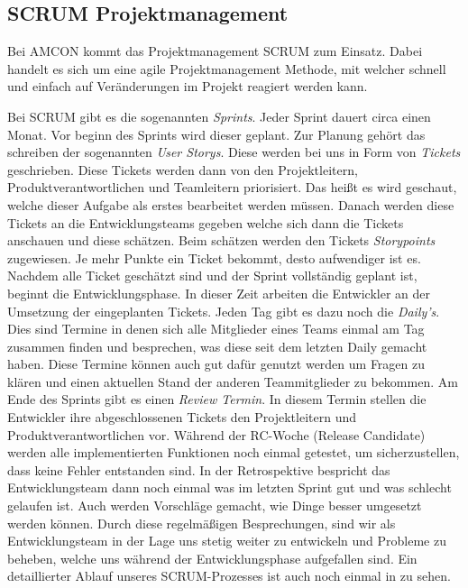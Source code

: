     \subsection{SCRUM Projektmanagement} \label{SCRUM}
        Bei AMCON kommt das Projektmanagement SCRUM zum Einsatz. Dabei handelt es sich um eine agile Projektmanagement
        Methode, mit welcher schnell und einfach auf Veränderungen im Projekt reagiert werden kann.

        Bei SCRUM gibt es die sogenannten \emph{Sprints}. Jeder Sprint dauert circa einen Monat. Vor beginn des Sprints
        wird dieser geplant. Zur Planung gehört das schreiben der sogenannten \emph{User Storys}. Diese werden bei uns
        in Form von \emph{Tickets} geschrieben. Diese Tickets werden dann von den Projektleitern, 
        Produktverantwortlichen und Teamleitern priorisiert. Das heißt es wird geschaut, welche dieser Aufgabe als 
        erstes bearbeitet werden müssen. Danach werden diese Tickets an die Entwicklungsteams gegeben welche sich dann
        die Tickets anschauen und diese schätzen. Beim schätzen werden den Tickets \emph{Storypoints} zugewiesen. Je
        mehr Punkte ein Ticket bekommt, desto aufwendiger ist es. Nachdem alle Ticket geschätzt sind und der Sprint
        vollständig geplant ist, beginnt die Entwicklungsphase. In dieser Zeit arbeiten die Entwickler an der Umsetzung
        der eingeplanten Tickets. Jeden Tag gibt es dazu noch die \emph{Daily's}. Dies sind Termine in denen sich alle 
        Mitglieder eines Teams einmal am Tag zusammen finden und besprechen, was diese seit dem letzten Daily gemacht 
        haben. Diese Termine können auch gut dafür genutzt werden um Fragen zu klären und einen aktuellen Stand der 
        anderen Teammitglieder zu bekommen. Am Ende des Sprints gibt es einen \emph{Review Termin}. In diesem Termin 
        stellen die Entwickler ihre abgeschlossenen Tickets den Projektleitern und Produktverantwortlichen vor. Während
        der RC-Woche (Release Candidate) werden alle implementierten Funktionen noch einmal getestet, um 
        sicherzustellen, dass keine Fehler entstanden sind. In der Retrospektive bespricht das Entwicklungsteam dann 
        noch einmal was im letzten Sprint gut und was schlecht gelaufen ist. Auch werden Vorschläge gemacht, wie Dinge 
        besser umgesetzt werden können. Durch diese regelmäßigen Besprechungen, sind wir als Entwicklungsteam in der 
        Lage uns stetig weiter zu entwickeln und Probleme zu beheben, welche uns während der Entwicklungsphase 
        aufgefallen sind. Ein detaillierter Ablauf unseres SCRUM-Prozesses ist auch noch einmal in 
        zu sehen.

